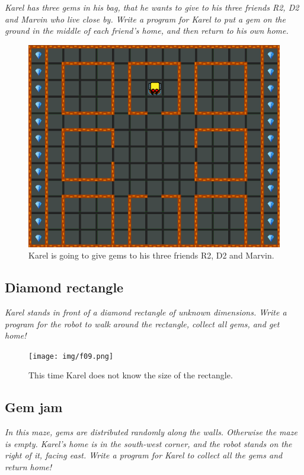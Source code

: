 {\em Karel has three gems in his bag, that he wants to give to his three friends R2, D2 and Marvin who live close by. Write a program for Karel to put a gem on the ground in the middle of each friend's home, and then return to his own home.}\\[-8mm]


\begin{figure}[!ht]
\begin{center}
\includegraphics[height=0.4\textwidth]{img/f08.png}
\end{center}
\vspace{-4mm}
\caption{Karel is going to give gems to his three friends R2, D2 and Marvin.}
\label{fig:f08}
\vspace{-10mm}
\end{figure}

\subsection{Diamond rectangle}

{\em Karel stands in front of a diamond rectangle of unknown dimensions. Write a program for the robot to walk around the rectangle, collect all gems, and get home!}\\[-8mm]


\begin{figure}[!ht]
\begin{center}
\texttt{[image: img/f09.png]}
\end{center}
\vspace{-4mm}
\caption{This time Karel does not know the size of the rectangle.}
\label{fig:f09}
\end{figure}
\vspace{-1.2cm}
\newpage


\subsection{Gem jam}

{\em In this maze, gems are distributed randomly along the walls. Otherwise 
the maze is empty. Karel's home is in the south-west corner, and the robot 
stands on the right of it, facing east. Write a program for Karel to collect 
all the gems and return home!}\\[-7mm]

